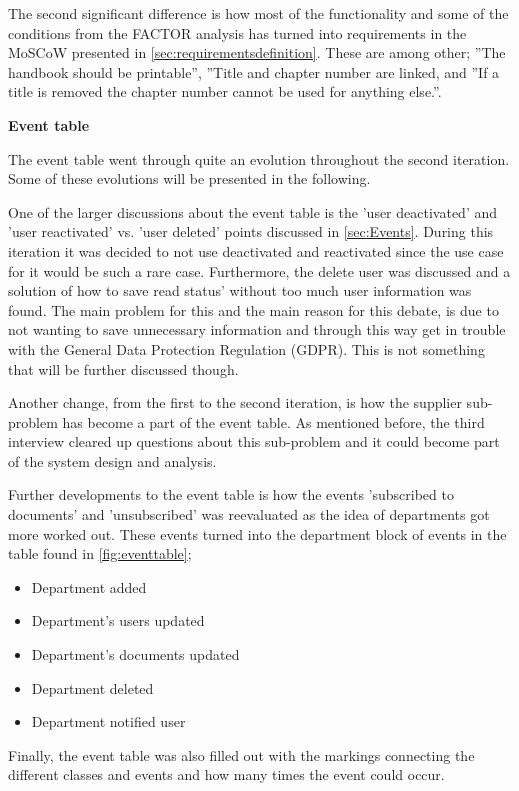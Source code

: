The second significant difference is how most of the functionality and some of the conditions from the FACTOR analysis has turned into requirements in the MoSCoW presented in \cref{sec:requirementsdefinition}. 
These are among other; ''The handbook should be printable'', ''Title and chapter number are linked, and ''If a title is removed the chapter number cannot be used for anything else.''.

\noindent\textbf{Event table}

The event table went through quite an evolution throughout the second iteration.
Some of these evolutions will be presented in the following.

One of the larger discussions about the event table is the 'user deactivated' and 'user reactivated' vs. 'user deleted' points discussed in \cref{sec:Events}.
During this iteration it was decided to not use deactivated and reactivated since the use case for it would be such a rare case.
Furthermore, the delete user was discussed and a solution of how to save read status' without too much user information was found.
The main problem for this and the main reason for this debate, is due to not wanting to save unnecessary information and through this way get in trouble with the General Data Protection Regulation (GDPR).
This is not something that will be further discussed though.

Another change, from the first to the second iteration, is how the supplier sub-problem has become a part of the event table.
As mentioned before, the third interview cleared up questions about this sub-problem and it could become part of the system design and analysis.

Further developments to the event table is how the events 'subscribed to documents' and 'unsubscribed' was reevaluated as the idea of departments got more worked out.
These events turned into the department block of events in the table found in \cref{fig:eventtable};
\begin{itemize}
	\item 
	Department added
	\item
	Department's users updated
	\item
	Department's documents updated
	\item
	Department deleted
	\item
	Department notified user
\end{itemize} 

Finally, the event table was also filled out with the markings connecting the different classes and events and how many times the event could occur.

